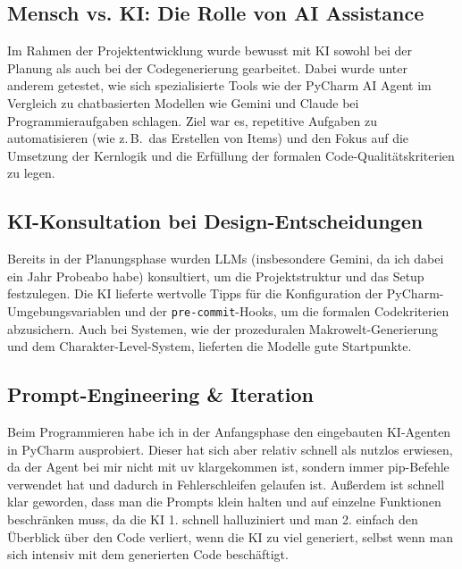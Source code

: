 \documentclass[12pt, a4paper]{article}
\begin{document}
\subsection{Mensch vs. KI: Die Rolle von AI Assistance}
Im Rahmen der Projektentwicklung wurde bewusst mit KI sowohl bei der Planung als auch bei der Codegenerierung gearbeitet.
Dabei wurde unter anderem getestet, wie sich spezialisierte Tools wie der PyCharm AI Agent im Vergleich zu chatbasierten Modellen wie Gemini und Claude bei Programmieraufgaben schlagen.
Ziel war es, repetitive Aufgaben zu automatisieren (wie z.\,B.\ das Erstellen von Items) und den Fokus auf die Umsetzung der Kernlogik und die Erfüllung der formalen Code-Qualitätskriterien zu legen.

\subsection{KI-Konsultation bei Design-Entscheidungen}
Bereits in der Planungsphase wurden LLMs (insbesondere Gemini, da ich dabei ein Jahr Probeabo habe) konsultiert, um die Projektstruktur und das Setup festzulegen.
Die KI lieferte wertvolle Tipps für die Konfiguration der PyCharm-Umgebungsvariablen und der \texttt{pre-commit}-Hooks, um die formalen Codekriterien abzusichern.
Auch bei Systemen, wie der prozeduralen Makrowelt-Generierung und dem Charakter-Level-System, lieferten die Modelle gute Startpunkte.

\subsection{Prompt-Engineering \& Iteration}
Beim Programmieren habe ich in der Anfangsphase den eingebauten KI-Agenten in PyCharm ausprobiert.
Dieser hat sich aber relativ schnell als nutzlos erwiesen, da der Agent bei mir nicht mit uv klargekommen ist, sondern immer pip-Befehle verwendet hat und dadurch in Fehlerschleifen gelaufen ist.
Außerdem ist schnell klar geworden, dass man die Prompts klein halten und auf einzelne Funktionen beschränken muss, da die KI
1. schnell halluziniert und man
2. einfach den Überblick über den Code verliert, wenn die KI zu viel generiert, selbst wenn man sich intensiv mit dem generierten Code beschäftigt.
\end{document}
